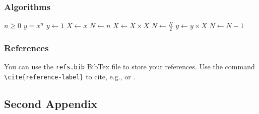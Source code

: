 \subsubsection{Algorithms}

\begin{algorithm}
\caption{An algorithm with caption}\label{alg:cap}
\begin{algorithmic}
\Require $n \geq 0$
\Ensure $y = x^n$
\State $y \gets 1$
\State $X \gets x$
\State $N \gets n$
    \State $X \gets X \times X$
    \State $N \gets \frac{N}{2}$  
    \State $y \gets y \times X$
    \State $N \gets N - 1$
\EndIf
\EndWhile
\end{algorithmic}
\end{algorithm}

\subsubsection{References}
You can use the \texttt{refs.bib} BibTex file to store your references. Use the command \texttt{\textbackslash cite\{reference-label\}} to cite, e.g., \cite{mlp-universal} or \cite{mlp-universal, rbf-universal}.

\newpage
\subsection{Second Appendix}

